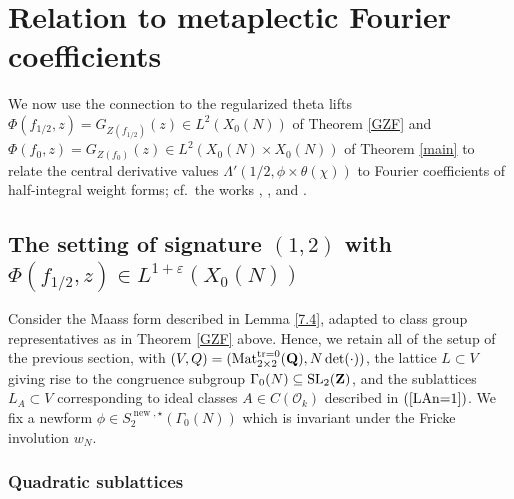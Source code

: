 \documentclass{amsart}
\theoremstyle{definition}
\theoremstyle{definition}
\theoremstyle{definition}
\begin{document}
\section{Relation to metaplectic Fourier coefficients}

We now use the connection to the regularized theta lifts $\Phi(f_{1/2}, z) = G_{Z(f_{1/2})}(z) \in L^2(X_0(N))$ of Theorem \ref{GZF} 
and $\Phi(f_0, z) = G_{Z(f_0)}(z) \in L^2(X_0(N) \times X_0(N))$ of Theorem \ref{main} to relate the central derivative values 
$\Lambda'(1/2, \phi \times \theta(\chi))$ to Fourier coefficients of half-integral weight forms; cf.~the works \cite{BO}, \cite{KaSa}, and \cite{BFI}. 

\subsection{The setting of signature $(1,2)$ with $\Phi(f_{1/2}, z) \in L^{1 + \varepsilon}(X_0(N))$}

Consider the Maass form described in Lemma \ref{7.4}, adapted to class group representatives as in Theorem \ref{GZF} above.
Hence, we retain all of the setup of the previous section, with $(V,Q) = (\operatorname{Mat}_{2 \times 2}^{\operatorname{tr=0}}({\bf{Q}}), N \det(\cdot))$,
the lattice $L \subset V$ giving rise to the congruence subgroup $\Gamma_0(N) \subseteq \operatorname{SL}_2({\bf{Z}})$, 
and the sublattices $L_A \subset V$ corresponding to ideal classes $A \in C(\mathcal{O}_k)$ described in $(\ref{LAn=1})$. 
We fix a newform $\phi \in S_2^{ \operatorname{new}, \star} (\Gamma_0(N))$ which is invariant under the Fricke involution $w_N$.

\subsubsection{Quadratic sublattices}
\end{document}
